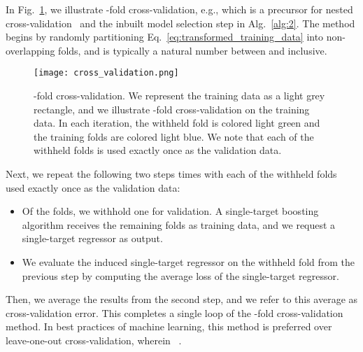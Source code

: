 \documentclass[aps,twocolumn,superscriptaddress,floatfix,preprintnumbers,showkeys]{revtex4}
\begin{document}
In Fig.~\ref{fig:cross_validation}, we illustrate -fold cross-validation, e.g.,  which is a precursor for nested cross-validation~\cite{Hastie_2009, Cawley_2010, Sklearn_2011} and the inbuilt model selection step in Alg.~\ref{alg:2}. The method begins by randomly partitioning Eq.~\ref{eq:transformed_training_data} into  non-overlapping folds, and  is typically a natural number between  and  inclusive.
\begin{figure}
\centering
\texttt{[image: cross\_validation.png]}
\caption{-fold cross-validation. We represent the training data as a light grey rectangle, and we illustrate -fold cross-validation on the training data. In each iteration, the withheld fold is colored light green and the  training folds are colored light blue. We note that each of the withheld folds is used exactly once as the validation data.}
\label{fig:cross_validation}
\end{figure}
Next, we repeat the following two steps  times with each of the withheld folds used exactly once as the validation data:\
\begin{itemize}
\item Of the  folds, we withhold one for validation. A single-target boosting algorithm receives the remaining  folds as training data, and we request a single-target regressor as output.
\item We evaluate the induced single-target regressor on the withheld fold from the previous step by computing the average loss of the single-target regressor.
\end{itemize}
Then, we average the  results from the second step, and we refer to this average as cross-validation error. This completes a single loop of the -fold cross-validation method. In best practices of machine learning, this method is preferred over leave-one-out cross-validation, wherein ~\cite{Hastie_2009, Cawley_2010, Sklearn_2011}.
\end{document}
